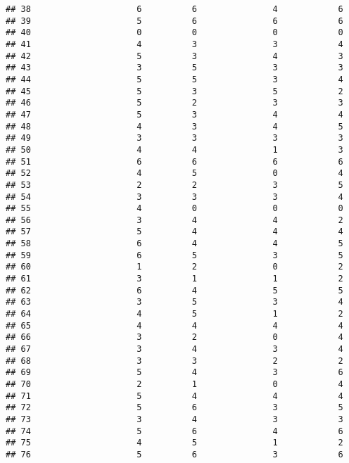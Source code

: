 \documentclass[
]{article}
\begin{document}
\begin{verbatim}
## 38                     6          6               4            6
## 39                     5          6               6            6
## 40                     0          0               0            0
## 41                     4          3               3            4
## 42                     5          3               4            3
## 43                     3          5               3            3
## 44                     5          5               3            4
## 45                     5          3               5            2
## 46                     5          2               3            3
## 47                     5          3               4            4
## 48                     4          3               4            5
## 49                     3          3               3            3
## 50                     4          4               1            3
## 51                     6          6               6            6
## 52                     4          5               0            4
## 53                     2          2               3            5
## 54                     3          3               3            4
## 55                     4          0               0            0
## 56                     3          4               4            2
## 57                     5          4               4            4
## 58                     6          4               4            5
## 59                     6          5               3            5
## 60                     1          2               0            2
## 61                     3          1               1            2
## 62                     6          4               5            5
## 63                     3          5               3            4
## 64                     4          5               1            2
## 65                     4          4               4            4
## 66                     3          2               0            4
## 67                     3          4               3            4
## 68                     3          3               2            2
## 69                     5          4               3            6
## 70                     2          1               0            4
## 71                     5          4               4            4
## 72                     5          6               3            5
## 73                     3          4               3            3
## 74                     5          6               4            6
## 75                     4          5               1            2
## 76                     5          6               3            6

\end{verbatim}
\end{document}
